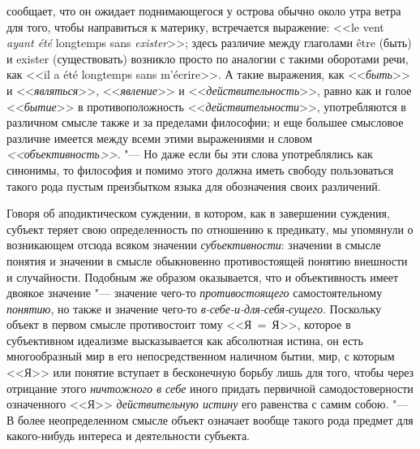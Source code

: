 {{{сообщает, что он ожидает поднимающегося у острова обычно около утра ветра
для того, чтобы направиться к материку, встречается выражение: <<le vent
{\em ayant été} longtemps sans
{\em exister}>>\label{bkm:bm64};
здесь различие между глаголами être (быть) и
exister (существовать) возникло просто по аналогии с такими
оборотами речи, как <<il a été longtemps sans
m'écrire>>.}
А такие выражения, как <<{\em быть}>> и <<{\em являться}>>,
<<{\em явление}>> и <<{\em действительность}>>, равно как и голое
<<{\em бытие}>> в противоположность <<{\em действительности}>>,
употребляются в различном смысле также и за пределами
философии; и еще большее смысловое различие имеется между всеми этими
выражениями и словом {\em <<объективность>>}. "---
Но даже если бы эти слова употреблялись как синонимы, то
философия и помимо этого должна иметь свободу пользоваться такого рода
пустым преизбытком языка для обозначения своих различений.

Говоря об аподиктическом суждении, в котором, как в завершении
суждения, субъект теряет свою определенность по отношению к предикату, мы
упомянули о возникающем отсюда всяком значении {\em субъективности}:
значении в смысле понятия и значении в смысле обыкновенно
противостоящей понятию внешности и
случайности.
Подобным же образом оказывается, что и объективность имеет
двоякое значение "--- значение чего-то {\em противостоящего}
самостоятельному {\em понятию}, но также и значение чего-то
{\em в-себе-и-для-себя-сущего}.
Поскольку объект в первом смысле противостоит тому <<Я~=~Я>>,
которое в субъективном идеализме высказывается как абсолютная истина, он
есть многообразный мир в его непосредственном наличном
бытии, мир, с которым <<Я>> или понятие вступает в бесконечную борьбу лишь
для того, чтобы через отрицание этого {\em ничтожного в себе}
иного придать первичной самодостоверности означенного <<Я>>
{\em действительную истину} его равенства с самим
собою.
"--- В более неопределенном смысле объект означает вообще такого
рода предмет для какого-нибудь интереса и деятельности субъекта.

}}
